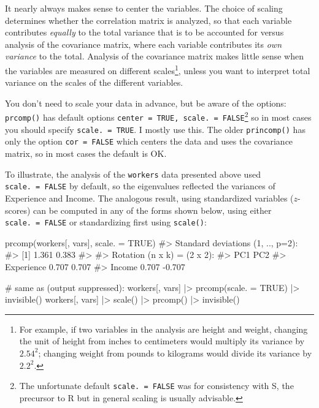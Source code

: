\documentclass[
  letterpaper,
  10pt,
  krantz2]{krantz}
\makeatletter
\newenvironment{Shaded}{\begin{snugshade}}{\end{snugshade}}
\newcommand{\AttributeTok}[1]{\textcolor[rgb]{0.40,0.45,0.13}{#1}}
\newcommand{\CommentTok}[1]{\textcolor[rgb]{0.37,0.37,0.37}{#1}}
\newcommand{\ConstantTok}[1]{\textcolor[rgb]{0.56,0.35,0.01}{#1}}
\newcommand{\FunctionTok}[1]{\textcolor[rgb]{0.28,0.35,0.67}{#1}}
\newcommand{\NormalTok}[1]{\textcolor[rgb]{0.00,0.23,0.31}{#1}}
\newcommand{\SpecialCharTok}[1]{\textcolor[rgb]{0.37,0.37,0.37}{#1}}
\newenvironment{kframe}{%
  \medskip{}
  \setlength{\fboxsep}{.8em}
  \def\at@end@of@kframe{}%
  \ifinner\ifhmode%
  \def\at@end@of@kframe{\end{minipage}}%
  \begin{minipage}{\columnwidth}%
  \fi\fi%
  \def\FrameCommand##1{\hskip\@totalleftmargin \hskip-\fboxsep
  \colorbox{shadecolor}{##1}\hskip-\fboxsep
      \hskip-\linewidth \hskip-\@totalleftmargin \hskip\columnwidth}%
  \MakeFramed {\advance\hsize-\width
    \@totalleftmargin\z@ \linewidth\hsize
    \@setminipage}}%
{\par\unskip\endMakeFramed%
  \at@end@of@kframe}
\renewenvironment{Shaded}{\begin{kframe}}{\end{kframe}}
\makeatother
\begin{document}
It nearly always makes sense to center the variables. The choice of
scaling determines whether the correlation matrix is analyzed, so that
each variable contributes \emph{equally} to the total variance that is
to be accounted for versus analysis of the covariance matrix, where each
variable contributes its \emph{own variance} to the total. Analysis of
the covariance matrix makes little sense when the variables are measured
on different scales\footnote{For example, if two variables in the
  analysis are height and weight, changing the unit of height from
  inches to centimeters would multiply its variance by \(2.54^2\);
  changing weight from pounds to kilograms would divide its variance by
  \(2.2^2\).}, unless you want to interpret total variance on the scales
of the different variables.

You don't need to scale your data in advance, but be aware of the
options: \texttt{prcomp()} has default options
\texttt{center\ =\ TRUE,\ scale.\ =\ FALSE}\footnote{The unfortunate
  default \texttt{scale.\ =\ FALSE} was for consistency with S, the
  precursor to R but in general scaling is usually advisable.} so in
most cases you should specify \texttt{scale.\ =\ TRUE}. I mostly use
this. The older \texttt{princomp()} has only the option
\texttt{cor\ =\ FALSE} which centers the data and uses the covariance
matrix, so in most cases the default is OK.

To illustrate, the analysis of the \texttt{workers} data presented above
used \texttt{scale.\ =\ FALSE} by default, so the eigenvalues reflected
the variances of Experience and Income. The analogous result, using
standardized variables (\(z\)-scores) can be computed in any of the
forms shown below, using either \texttt{scale.\ =\ FALSE} or
standardizing first using \texttt{scale()}:

\begin{Shaded}
\begin{Highlighting}[]
\FunctionTok{prcomp}\NormalTok{(workers[, vars], }\AttributeTok{scale. =} \ConstantTok{TRUE}\NormalTok{)}
\CommentTok{\#\textgreater{} Standard deviations (1, .., p=2):}
\CommentTok{\#\textgreater{} [1] 1.361 0.383}
\CommentTok{\#\textgreater{} }
\CommentTok{\#\textgreater{} Rotation (n x k) = (2 x 2):}
\CommentTok{\#\textgreater{}              PC1    PC2}
\CommentTok{\#\textgreater{} Experience 0.707  0.707}
\CommentTok{\#\textgreater{} Income     0.707 {-}0.707}

\CommentTok{\# same as (output suppressed):}
\NormalTok{workers[, vars] }\SpecialCharTok{|\textgreater{}} \FunctionTok{prcomp}\NormalTok{(}\AttributeTok{scale. =} \ConstantTok{TRUE}\NormalTok{) }\SpecialCharTok{|\textgreater{}} \FunctionTok{invisible}\NormalTok{()}
\NormalTok{workers[, vars] }\SpecialCharTok{|\textgreater{}} \FunctionTok{scale}\NormalTok{() }\SpecialCharTok{|\textgreater{}} \FunctionTok{prcomp}\NormalTok{() }\SpecialCharTok{|\textgreater{}} \FunctionTok{invisible}\NormalTok{()}
\end{Highlighting}
\end{Shaded}
\end{document}
